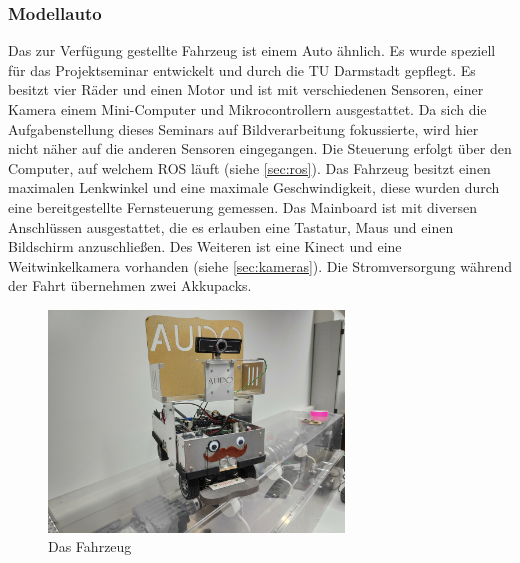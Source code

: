 \subsubsection{Modellauto}
\label{sec:modellauto}
Das zur Verfügung gestellte Fahrzeug ist einem Auto ähnlich. Es wurde speziell für das Projektseminar entwickelt und durch die TU Darmstadt gepflegt. Es besitzt vier Räder und einen Motor und ist mit verschiedenen Sensoren, einer Kamera einem Mini-Computer und Mikrocontrollern ausgestattet. Da sich die Aufgabenstellung dieses Seminars auf Bildverarbeitung fokussierte, wird hier nicht näher auf die anderen Sensoren eingegangen. 
Die Steuerung erfolgt über den Computer, auf welchem ROS läuft (siehe \autoref{sec:ros}). Das Fahrzeug besitzt einen maximalen Lenkwinkel und eine maximale Geschwindigkeit, diese wurden durch eine bereitgestellte Fernsteuerung gemessen.
Das Mainboard ist mit diversen Anschlüssen ausgestattet, die es erlauben eine Tastatur, Maus und einen Bildschirm anzuschließen. Des Weiteren ist eine Kinect und eine Weitwinkelkamera vorhanden (siehe \autoref{sec:kameras}). Die Stromversorgung während der Fahrt übernehmen zwei Akkupacks.
\begin{figure}
	\centering
	\includegraphics[width=0.7\textwidth]{images/audo.jpg}
	\caption{Das Fahrzeug}
	\label{abb:audo}
\end{figure}
